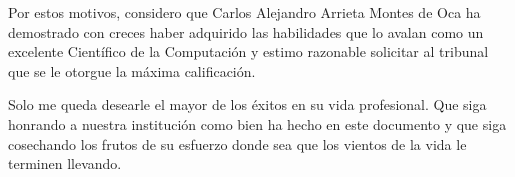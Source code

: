 \begin{opinion}
    Por estos motivos, considero que Carlos Alejandro Arrieta Montes de Oca ha demostrado con creces haber adquirido las habilidades que lo avalan como un excelente Científico de la Computación y estimo razonable solicitar al tribunal que se le otorgue la máxima calificación.
    \newline
    
    Solo me queda desearle el mayor de los éxitos en su vida profesional. Que siga honrando a nuestra institución como bien ha hecho en este documento y que siga cosechando los frutos de su esfuerzo donde sea que los vientos de la vida le terminen llevando.
\end{opinion}